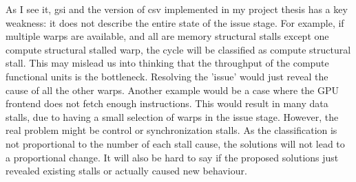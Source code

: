 As I see it, \acrshort{gsi} and the version of \acrshort{csv} implemented in my project thesis has a key weakness: it does not describe the entire state of the issue stage. For example, if multiple warps are available, and all are memory structural stalls except one compute structural stalled warp, the cycle will be classified as compute structural stall. This may mislead us into thinking that the throughput of the compute functional units is the bottleneck. Resolving the 'issue' would just reveal the cause of all the other warps. Another example would be a case where the GPU frontend does not fetch enough instructions. This would result in many data stalls, due to having a small selection of warps in the issue stage. However, the real problem might be control or synchronization stalls. As the classification is not proportional to the number of each stall cause, the solutions will not lead to a proportional change. It will also be hard to say if the proposed solutions just revealed existing stalls or actually caused new behaviour. 

